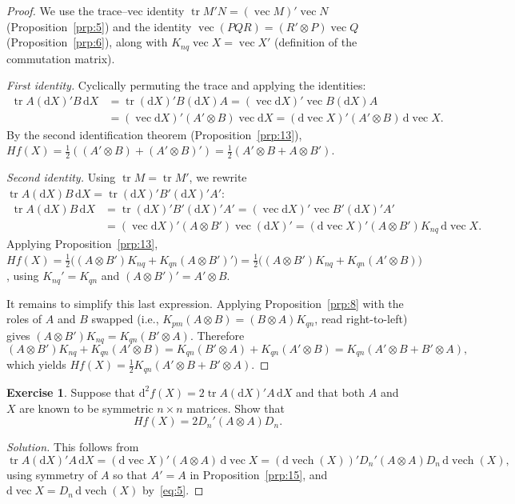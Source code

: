 \documentclass[14pt]{extarticle}
\theoremstyle{plain}
\theoremstyle{definition}
\newtheorem{exercise}{Exercise}
\theoremstyle{remark}
\newenvironment{solution}{%
  \begin{proof}[Solution]%
}{%
  \end{proof}%
}
\DeclareMathOperator{\tr}{tr}
\DeclareMathOperator{\vech}{vech}
\DeclareMathOperator{\avec}{vec}
\newcommand{\dd}{\mathrm{d}}
\begin{document}
\begin{proof}
We use the trace--vec identity $\tr M'N = (\avec M)'\avec N$ (Proposition~\ref{prp:5}) and the identity $\avec(PQR) = (R' \otimes P)\avec Q$ (Proposition~\ref{prp:6}), along with $K_{nq}\avec X = \avec X'$ (definition of the commutation matrix).

\emph{First identity.} Cyclically permuting the trace and applying the identities:
\begin{align*}
\tr A(\dd X)'B\, \dd X &= \tr(\dd X)'B(\dd X)A = (\avec \dd X)' \avec B(\dd X)A \\
&= (\avec \dd X)'(A' \otimes B) \avec \dd X = (\dd\avec X)'(A' \otimes B)\, \dd\avec X.
\end{align*}
By the second identification theorem (Proposition~\ref{prp:13}), $Hf(X) = \tfrac{1}{2}((A'\otimes B) + (A'\otimes B)') = \tfrac{1}{2}(A'\otimes B + A\otimes B')$.

\emph{Second identity.} Using $\tr M = \tr M'$, we rewrite $\tr A(\dd X)B\, \dd X = \tr (\dd X)'B'(\dd X)'A'$:
\begin{align*}
\tr A(\dd X)B\, \dd X &= \tr(\dd X)'B'(\dd X)'A' = (\avec \dd X)' \avec B'(\dd X)'A' \\
&= (\avec \dd X)'(A \otimes B') \avec (\dd X)' = (\dd\avec X)'(A \otimes B') K_{nq}\, \dd\avec X.
\end{align*}
Applying Proposition~\ref{prp:13}, $Hf(X) = \tfrac{1}{2}\bigl((A\otimes B')K_{nq} + K_{qn}(A\otimes B')'\bigr) = \tfrac{1}{2}\bigl((A\otimes B')K_{nq} + K_{qn}(A'\otimes B)\bigr)$, using $K_{nq}' = K_{qn}$ and $(A\otimes B')' = A'\otimes B$.

It remains to simplify this last expression. Applying Proposition~\ref{prp:8} with the roles of $A$ and $B$ swapped (i.e., $K_{pm}(A\otimes B) = (B\otimes A)K_{qn}$, read right-to-left) gives $(A\otimes B')K_{nq} = K_{qn}(B'\otimes A)$. Therefore
\[
(A\otimes B')K_{nq} + K_{qn}(A'\otimes B) = K_{qn}(B'\otimes A) + K_{qn}(A'\otimes B) = K_{qn}(A'\otimes B + B'\otimes A),
\]
which yields $Hf(X) = \tfrac{1}{2}K_{qn}(A'\otimes B + B'\otimes A)$.
\end{proof}

\begin{exercise}\label{exer:28}
Suppose that $\dd^2 f(X) = 2\tr A(\dd X)'A\, \dd X$ and that both $A$ and $X$ are known to be symmetric $n \times n$ matrices. Show that
\[
Hf(X) = 2D_n'(A \otimes A)D_n.
\]
\end{exercise}

\begin{solution}
This follows from
\[
\tr A(\dd X)'A\, \dd X = (\dd\avec X)'(A \otimes A)\, \dd\avec X
= (\dd\vech(X))' D_n'(A \otimes A) D_n\, \dd\vech(X),
\]
using symmetry of $A$ so that $A' = A$ in Proposition~\ref{prp:15}, and $\dd\avec X = D_n\, \dd\vech(X)$ by~\eqref{eq:5}.
\end{solution}
\end{document}
